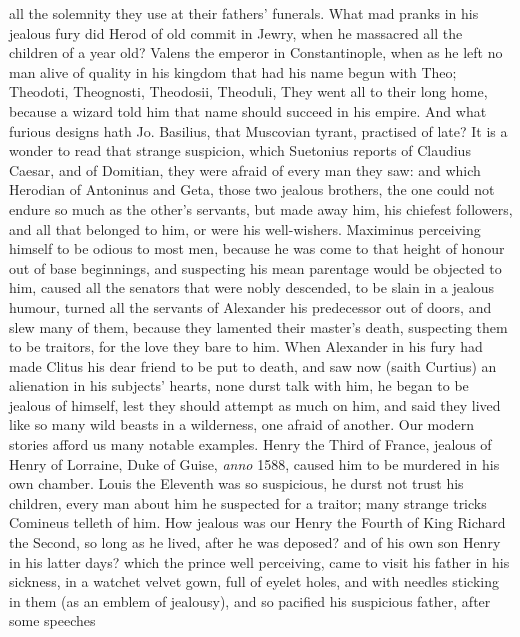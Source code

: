 all the solemnity they use at their fathers' funerals. What mad pranks
in his jealous fury did Herod of old commit in Jewry, when he massacred
all the children of a year old? Valens the emperor in
Constantinople, when as he left no man alive of quality in his kingdom
that had his name begun with Theo; Theodoti, Theognosti, Theodosii,
Theoduli, \etc{} They went all to their long home, because a wizard told
him that name should succeed in his empire. And what furious designs
hath Jo. Basilius, that Muscovian tyrant, practised of late? It
is a wonder to read that strange suspicion, which Suetonius reports of
Claudius Caesar, and of Domitian, they were afraid of every man they
saw: and which Herodian of Antoninus and Geta, those two jealous
brothers, the one could not endure so much as the other's servants, but
made away him, his chiefest followers, and all that belonged to him, or
were his well-wishers. Maximinus perceiving himself to be odious
to most men, because he was come to that height of honour out of base
beginnings, and suspecting his mean parentage would be objected to him,
caused all the senators that were nobly descended, to be slain in a
jealous humour, turned all the servants of Alexander his predecessor
out of doors, and slew many of them, because they lamented their
master's death, suspecting them to be traitors, for the love they bare
to him. When Alexander in his fury had made Clitus his dear friend to
be put to death, and saw now (saith Curtius) an alienation in his
subjects' hearts, none durst talk with him, he began to be jealous of
himself, lest they should attempt as much on him, and said they lived
like so many wild beasts in a wilderness, one afraid of another. Our
modern stories afford us many notable examples. Henry the Third
of France, jealous of Henry of Lorraine, Duke of Guise, \emph{anno} 1588,
caused him to be murdered in his own chamber. Louis the Eleventh
was so suspicious, he durst not trust his children, every man about him
he suspected for a traitor; many strange tricks Comineus telleth of
him. How jealous was our Henry the Fourth of King Richard the
Second, so long as he lived, after he was deposed? and of his own son
Henry in his latter days? which the prince well perceiving, came to
visit his father in his sickness, in a watchet velvet gown, full of
eyelet holes, and with needles sticking in them (as an emblem of
jealousy), and so pacified his suspicious father, after some speeches
